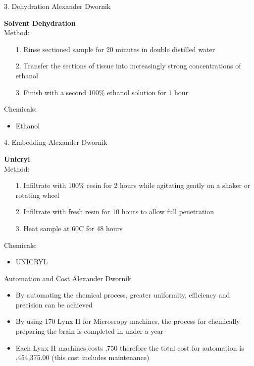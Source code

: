 \documentclass[10pt]{beamer}
\begin{document}
\begin{frame}{3. Dehydration\hspace{0pt plus 1 filll} \small{Alexander Dwornik}}

\textbf{Solvent Dehydration} \\
				Method: \cite{dehydrationmethod}
				


\begin{itemize}
	\item[1.] Rinse sectioned sample for 20 minutes in double distilled water
	\item[2.] Transfer the sections of tissue into increasingly strong concentrations of ethanol
	\item[3.] Finish with a second 100\% ethanol solution for 1 hour
\end{itemize}	
	Chemicals:
\begin{itemize}[label={$\bullet$}]
	\item Ethanol
\end{itemize}
\end{frame}


\begin{frame}{4. Embedding\hspace{0pt plus 1 filll} \small{Alexander Dwornik}}


\textbf{Unicryl} \\
				Method: \cite{Unicryl}
				
\begin{itemize}
				 
\item[1.] Infiltrate with 100\% resin for 2 hours while agitating gently on a shaker or rotating wheel
\item[2.] Infiltrate with fresh resin for 10 hours to allow full penetration
\item[3.] Heat sample at 60\degree C for 48 hours
\end{itemize}
	
	\setlength\parindent{0pt}
	Chemicals: \\
	
\begin{itemize}[label={$\bullet$}]
	\item UNICRYL
\end{itemize}
\end{frame}

\begin{frame}{Automation and Cost\hspace{0pt plus 1 filll} \small{Alexander Dwornik}}

\begin{itemize}[label={$\bullet$}]
	\item By automating the chemical process, greater uniformity, efficiency and precision can be achieved
	\item By using 170 Lynx II for Microscopy machines, the process for chemically preparing the brain is completed in under a year
	\item Each Lynx II machines costs ,750 \cite{lynxII} therefore the total cost for automation is  ,454,375.00 (this cost includes maintenance) 
\end{itemize}
\end{frame}
\end{document}
